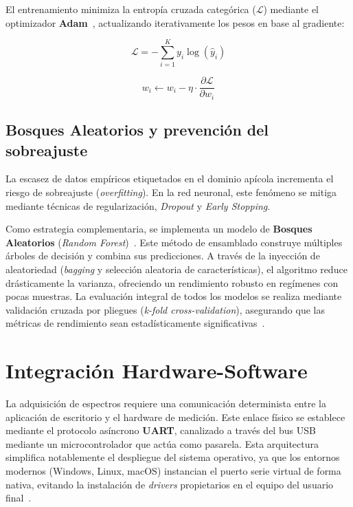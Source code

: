 El entrenamiento minimiza la entropía cruzada categórica ($\mathcal{L}$) mediante el optimizador \textbf{Adam}~\cite{kingma2015adam}, actualizando iterativamente los pesos en base al gradiente:

\begin{equation}
    \mathcal{L} = -\sum_{i=1}^{K} y_i \log(\hat{y}_i)
\end{equation}

\begin{equation}
    w_i \leftarrow w_i - \eta \cdot \frac{\partial \mathcal{L}}{\partial w_i}
\end{equation}

\subsection{Bosques Aleatorios y prevención del sobreajuste}

La escasez de datos empíricos etiquetados en el dominio apícola incrementa el riesgo de sobreajuste (\textit{overfitting}). En la red neuronal, este fenómeno se mitiga mediante técnicas de regularización, \textit{Dropout} y \textit{Early Stopping}.

Como estrategia complementaria, se implementa un modelo de \textbf{Bosques Aleatorios} (\textit{Random Forest})~\cite{breiman2001rf}. Este método de ensamblado construye múltiples árboles de decisión y combina sus predicciones. A través de la inyección de aleatoriedad (\textit{bagging} y selección aleatoria de características), el algoritmo reduce drásticamente la varianza, ofreciendo un rendimiento robusto en regímenes con pocas muestras. La evaluación integral de todos los modelos se realiza mediante validación cruzada por pliegues (\textit{k-fold cross-validation}), asegurando que las métricas de rendimiento sean estadísticamente significativas~\cite{hastie2009esl}.

\section{Integración Hardware-Software}

La adquisición de espectros requiere una comunicación determinista entre la aplicación de escritorio y el hardware de medición. Este enlace físico se establece mediante el protocolo asíncrono \textbf{UART}, canalizado a través del bus USB mediante un microcontrolador que actúa como pasarela. Esta arquitectura simplifica notablemente el despliegue del sistema operativo, ya que los entornos modernos (Windows, Linux, macOS) instancian el puerto serie virtual de forma nativa, evitando la instalación de \textit{drivers} propietarios en el equipo del usuario final~\cite{axelson2007serial}.